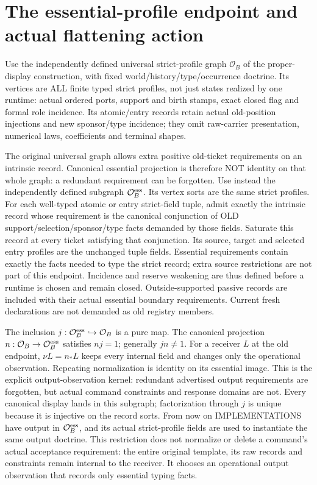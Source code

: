 \documentclass[11pt]{article}
\begin{document}
\section{The essential-profile endpoint and actual flattening action}
Use the independently defined universal strict-profile graph $\mathcal O_B$ of the proper-display construction, with fixed world/history/type/occurrence doctrine. Its vertices are ALL finite typed strict profiles, not just states realized by one runtime: actual ordered ports, support and birth stamps, exact closed flag and formal role incidence. Its atomic/entry records retain actual old-position injections and new sponsor/type incidence; they omit raw-carrier presentation, numerical laws, coefficients and terminal shapes.

The original universal graph allows extra positive old-ticket requirements on an intrinsic record. Canonical essential projection is therefore NOT identity on that whole graph: a redundant requirement can be forgotten. Use instead the independently defined subgraph $\mathcal O_B^{\rm ess}$. Its vertex sorts are the same strict profiles. For each well-typed atomic or entry strict-field tuple, admit exactly the intrinsic record whose requirement is the canonical conjunction of OLD support/selection/sponsor/type facts demanded by those fields. Saturate this record at every ticket satisfying that conjunction. Its source, target and selected entry profiles are the unchanged tuple fields. Essential requirements contain exactly the facts needed to type the strict record; extra source restrictions are not part of this endpoint. Incidence and reserve weakening are thus defined before a runtime is chosen and remain closed. Outside-supported passive records are included with their actual essential boundary requirements. Current fresh declarations are not demanded as old registry members.

The inclusion $j:\mathcal O_B^{\rm ess}\hookrightarrow\mathcal O_B$ is a pure map. The canonical projection $n:\mathcal O_B\to\mathcal O_B^{\rm ess}$ satisfies $nj=1$; generally $jn\ne1$. For a receiver $L$ at the old endpoint, $\nu L=n_*L$ keeps every internal field and changes only the operational observation. Repeating normalization is identity on its essential image. This is the explicit output-observation kernel: redundant advertised output requirements are forgotten, but actual command constraints and response domains are not. Every canonical display lands in this subgraph; factorization through $j$ is unique because it is injective on the record sorts. From now on IMPLEMENTATIONS have output in $\mathcal O_B^{\rm ess}$, and its actual strict-profile fields are used to instantiate the same output doctrine. This restriction does not normalize or delete a command's actual acceptance requirement: the entire original template, its raw records and constraints remain internal to the receiver. It chooses an operational output observation that records only essential typing facts.
\end{document}

